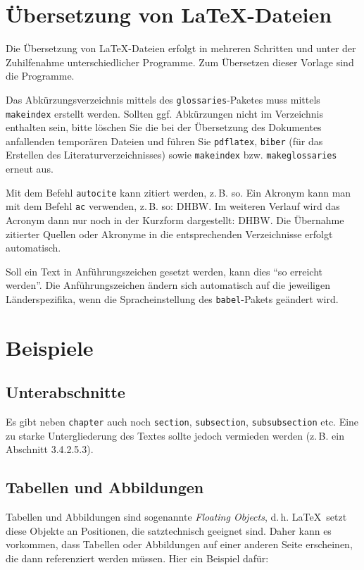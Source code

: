 \section{Übersetzung von \LaTeX-Dateien}
Die Übersetzung von \LaTeX-Dateien erfolgt in mehreren Schritten und unter der Zuhilfenahme unterschiedlicher Programme. Zum Übersetzen dieser Vorlage sind die Programme.

Das Abkürzungsverzeichnis mittels des \texttt{glossaries}-Paketes muss mittels \texttt{makeindex} erstellt werden. Sollten ggf. Abkürzungen nicht im Verzeichnis enthalten sein,
bitte löschen Sie die bei der Übersetzung des Dokumentes anfallenden temporären Dateien und führen Sie \texttt{pdflatex}, \texttt{biber} (für das Erstellen des Literaturverzeichnisses) sowie \texttt{makeindex} bzw. \texttt{makeglossaries} erneut aus.

Mit dem Befehl \texttt{autocite} kann zitiert werden, z.\,B. so\autocite[Vgl.][S. 18ff.]{ME12}.
Ein Akronym kann man mit dem Befehl \texttt{ac} verwenden, z.\,B. so: \ac{DHBW}. Im weiteren Verlauf wird das 
Acronym dann nur noch in der Kurzform dargestellt: \ac{DHBW}. Die Übernahme zitierter Quellen oder Akronyme in die 
entsprechenden Verzeichnisse erfolgt automatisch. 

Soll ein Text in Anführungszeichen gesetzt werden, kann dies  \enquote{so erreicht werden}. Die Anführungszeichen ändern sich automatisch auf die 
jeweiligen Länderspezifika, wenn die Spracheinstellung des \texttt{babel}-Pakets geändert wird.




\section{Beispiele}
\lipsum[1]

\subsection{Unterabschnitte}
Es gibt neben \texttt{chapter} auch noch  \texttt{section}, \texttt{subsection}, \texttt{subsubsection} etc. Eine zu starke Untergliederung des Textes sollte jedoch vermieden werden (z.\,B. ein Abschnitt 3.4.2.5.3). 

\subsection{Tabellen und Abbildungen}
Tabellen und Abbildungen sind sogenannte \textit{Floating Objects}, d.\,h. \LaTeX\ setzt diese Objekte an Positionen, die satztechnisch geeignet sind. Daher kann es vorkommen, dass Tabellen oder Abbildungen auf einer anderen Seite erscheinen, die dann referenziert werden müssen. Hier ein Beispiel dafür: 


